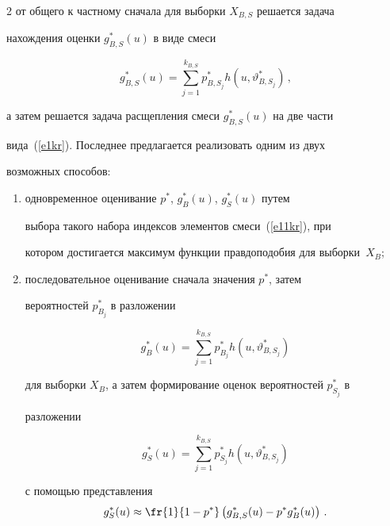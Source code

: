 \begin{multicols}{2}
от общего к частному сначала для выборки $X_{B,S}$ решается задача 


нахождения оценки $g_{B,S}^*(u)$ в виде смеси


     \begin{equation}


g_{B,S}^* (u) = \sum\limits_{j=1}^{k_{B,S}} p_{B,S_j}^* h\left ( 


u,\vartheta_{B,S_j}^* \right )\,,


     \label{e11kr}


     \end{equation}


а затем решается задача расщепления смеси $g_{B,S}^*(u)$ на две части 


вида~(\ref{e1kr}). Последнее предлагается реализовать одним из двух 


возможных способов: 


\begin{enumerate}[(1)]


\item одновременное оценивание $p^*$, $g_{B}^*(u)$, $g_S^*(u)$ путем 


выбора такого набора индексов элементов смеси~(\ref{e11kr}), при 


котором достигается максимум функции правдоподобия для выборки~$X_B$;


\item последовательное оценивание сначала значения $p^*$, затем 


вероятностей $p_{B_j}^*$ в разложении 


$$


g_B^*(u) = \sum\limits_{j=1}^{k_{B,S}}p_{B_j}^* h\left (u, \vartheta_{B,S_j}^*\right )


$$ 


для выборки $X_B$, а затем формирование оценок вероятностей $p_{S_j}^*$ в 


разложении 


$$


g_S^*(u) = \sum\limits_{j=1}^{k_{B,S}}p_{S_j}^* h  \left (u,\vartheta_{B,S_j}^*\right )


$$ 


с помощью представления $$


g_S^*(u) \approx \fr{1}{1-p^*}\left ( g_{B,S}^*(u) -p^* g_B^*(u)\right )\,.


$$


     \end{enumerate}



\end{multicols}
